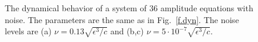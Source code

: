 \begin{figure}
\caption[Dynamics with noise]{\protect\label{f.dynn}
The dynamical behavior of a system of 36 amplitude equations with
noise. The parameters are the same as in Fig.~\ref{f.dyn}. The noise
levels are (a) $\nu=0.13\sqrt{\epsilon^3/c}$ and (b,c) $\nu=5\cdot
10^{-7}\sqrt{\epsilon^3/c}$.  }
\end{figure}



